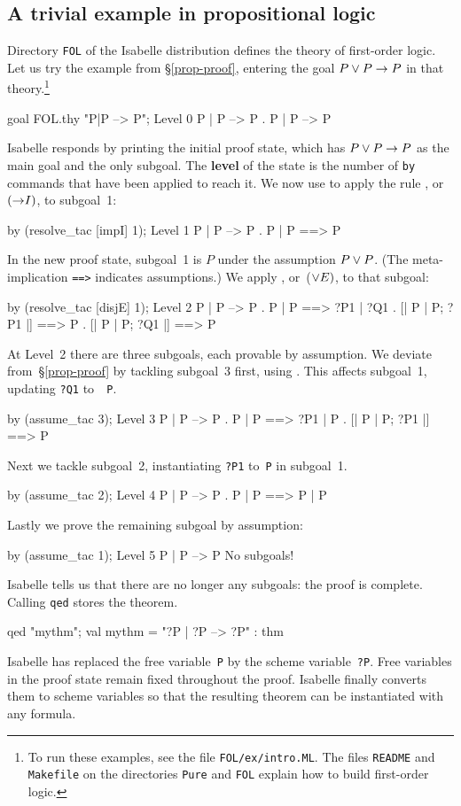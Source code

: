 \subsection{A trivial example in propositional logic}

Directory {\tt FOL} of the Isabelle distribution defines the theory of
first-order logic.  Let us try the example from \S\ref{prop-proof},
entering the goal $P\vee P\rightarrow P$ in that theory.\footnote{To run these
  examples, see the file {\tt FOL/ex/intro.ML}.  The files {\tt README} and
  {\tt Makefile} on the directories {\tt Pure} and {\tt FOL} explain how to
  build first-order logic.}
\begin{ttbox}
goal FOL.thy "P|P --> P"; 
{\out Level 0} 
{\out P | P --> P} 
{. P | P --> P} 
\end{ttbox}
Isabelle responds by printing the initial proof state, which has $P\vee
P\rightarrow P$ as the main goal and the only subgoal.  The {\bf level} of the
state is the number of {\tt by} commands that have been applied to reach
it.  We now use  to apply the rule ,
or~$({\rightarrow}I)$, to subgoal~1:
\begin{ttbox}
by (resolve_tac [impI] 1); 
{\out Level 1} 
{\out P | P --> P} 
{. P | P ==> P}
\end{ttbox}
In the new proof state, subgoal~1 is $P$ under the assumption $P\vee P$.
(The meta-implication {\tt==>} indicates assumptions.)  We apply
, or~(${\vee}E)$, to that subgoal:
\begin{ttbox}
by (resolve_tac [disjE] 1); 
{\out Level 2} 
{\out P | P --> P} 
{. P | P ==> ?P1 | ?Q1} 
{. [| P | P; ?P1 |] ==> P} 
{. [| P | P; ?Q1 |] ==> P}
\end{ttbox}
At Level~2 there are three subgoals, each provable by assumption.  We
deviate from~\S\ref{prop-proof} by tackling subgoal~3 first, using
.  This affects subgoal~1, updating {\tt?Q1} to~{\tt
  P}.
\begin{ttbox}
by (assume_tac 3); 
{\out Level 3} 
{\out P | P --> P} 
{. P | P ==> ?P1 | P} 
{. [| P | P; ?P1 |] ==> P}
\end{ttbox}
Next we tackle subgoal~2, instantiating {\tt?P1} to~{\tt P} in subgoal~1.
\begin{ttbox}
by (assume_tac 2); 
{\out Level 4} 
{\out P | P --> P} 
{. P | P ==> P | P}
\end{ttbox}
Lastly we prove the remaining subgoal by assumption:
\begin{ttbox}
by (assume_tac 1); 
{\out Level 5} 
{\out P | P --> P} 
{\out No subgoals!}
\end{ttbox}
Isabelle tells us that there are no longer any subgoals: the proof is
complete.  Calling {\tt qed} stores the theorem.
\begin{ttbox}
qed "mythm";
{\out val mythm = "?P | ?P --> ?P" : thm} 
\end{ttbox}
Isabelle has replaced the free variable~{\tt P} by the scheme
variable~{\tt?P}\@.  Free variables in the proof state remain fixed
throughout the proof.  Isabelle finally converts them to scheme variables
so that the resulting theorem can be instantiated with any formula.

